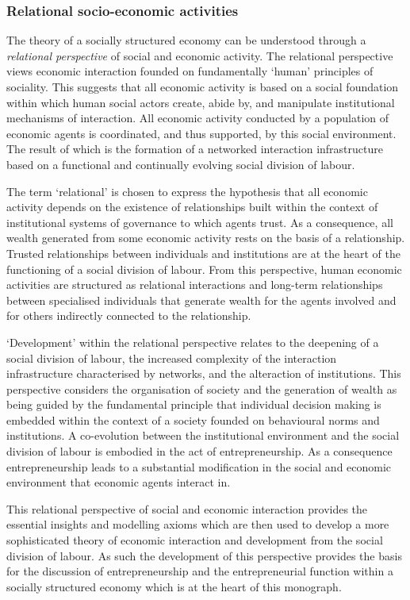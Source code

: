 \subsubsection{Relational socio-economic activities}

The theory of a socially structured economy can be understood through a \emph{relational perspective} of social and economic activity. The relational perspective views economic interaction founded on fundamentally `human' principles of sociality. This suggests that all economic activity is based on a social foundation within which human social actors create, abide by, and manipulate institutional mechanisms of interaction. All economic activity conducted by a population of economic agents is coordinated, and thus supported, by this social environment. The result of which is the formation of a networked interaction infrastructure based on a functional and continually evolving social division of labour.

The term `relational' is chosen to express the hypothesis that all economic activity depends on the existence of relationships built within the context of institutional systems of governance to which agents trust. As a consequence, all wealth generated from some economic activity rests on the basis of a relationship. Trusted relationships between individuals and institutions are at the heart of the functioning of a social division of labour. From this perspective, human economic activities are structured as relational interactions and long-term relationships between specialised individuals that generate wealth for the agents involved and for others indirectly connected to the relationship. 

`Development' within the relational perspective relates to the deepening of a social division of labour, the increased complexity of the interaction infrastructure characterised by networks, and the alteraction of institutions. This perspective considers the organisation of society and the generation of wealth as being guided by the fundamental principle that individual decision making is embedded within the context of a society founded on behavioural norms and institutions. A co-evolution between the institutional environment and the social division of labour is embodied in the act of entrepreneurship. As a consequence entrepreneurship leads to a substantial modification in the social and economic environment that economic agents interact in.

This relational perspective of social and economic interaction provides the essential insights and modelling axioms which are then used to develop a more sophisticated theory of economic interaction and development from the social division of labour. As such the development of this perspective provides the basis for the discussion of entrepreneurship and the entrepreneurial function within a socially structured economy which is at the heart of this monograph.

